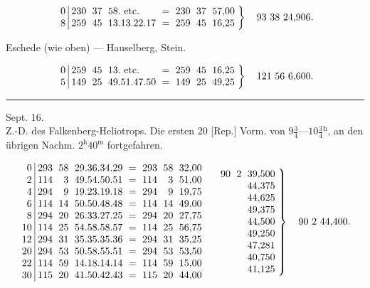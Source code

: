 \[
\setlength{\arraycolsep}{3pt}
\left.\begin{array}{r|rrlcrrr}
0&230&37&58.\ \text{etc.}&=&230&37&57{,}00\\
8&259&45&13.13.22.17&=&259&45&16{,}25
\end{array}\right\}\quad93\ 38\ 24{,}906.
\]
\begin{center}Eschede (wie oben) --- Hauselberg, Stein.\end{center}
\[
\setlength{\arraycolsep}{3pt}
\left.\begin{array}{r|rrlcrrr}
0&259&45&13.\ \text{etc.}&=&259&45&16{,}25\\
5&149&25&49.51.47.50&=&149&25&49{,}25
\end{array}\right\}\quad121\ 56\ 6{,}600.
\]
\noindent\rule{\textwidth}{.4pt}
\begin{center}
Sept. 16.\\[4pt]
Z.-D. des Falkenberg-Heliotrops. Die ersten 20 [Rep.] Vorm. von $9\frac34$---$10\frac34{}^{\mathrm h}$, an den übrigen Nachm. $2^{\mathrm h}40^{\mathrm m}$ fortgefahren.
\end{center}
\[
\setlength{\arraycolsep}{3pt}
\begin{array}{r|rrlcrrr}
0&293&58&29.36.34.29&=&293&58&32{,}00\\
2&114&3&49.54.50.51&=&114&3&51{,}00\\
4&294&9&19.23.19.18&=&294&9&19{,}75\\
6&114&14&50.50.48.48&=&114&14&49{,}00\\
8&294&20&26.33.27.25&=&294&20&27{,}75\\
10&114&25&54.58.58.57&=&114&25&56{,}75\\
12&294&31&35.35.35.36&=&294&31&35{,}25\\
20&294&53&50.58.55.51&=&294&53&53{,}50\\
22&114&59&14.18.14.14&=&114&59&15{,}00\\
30&115&20&41.50.42.43&=&115&20&44{,}00
\end{array}
\quad
\left.\begin{array}{rrr}
90&2&39{,}500\\&&44{,}375\\&&44{,}625\\&&49{,}375\\&&44{,}500\\
&&49{,}250\\&&47{,}281\\&&40{,}750\\&&41{,}125
\end{array}\right\}\quad90\ 2\ 44{,}400.
\]

